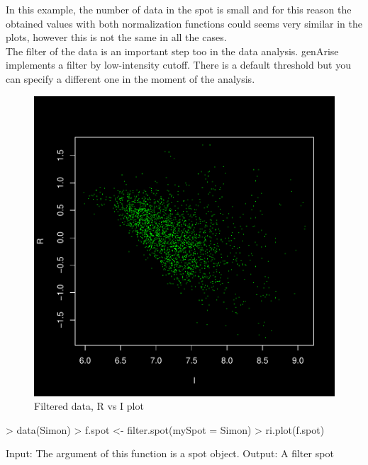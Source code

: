 \documentclass[12pt]{article}
\begin{document}
In this example, the number of data in the spot is small and for this reason the obtained values with both normalization functions could seems very similar in the plots, however this is not the same in all the cases.\\
\pagebreak
The filter of the data is an important step too in the data analysis. genArise implements a filter by low-intensity cutoff. There is a default threshold but you can specify a different one in the moment of the analysis.
\begin{figure}[h]
\begin{center}
\includegraphics{example-genArise-012}
\caption{Filtered data, R vs I plot \label{fig8}}	
\end{center}
\end{figure}

\begin{Scode}
> data(Simon)
> f.spot <- filter.spot(mySpot = Simon)
> ri.plot(f.spot)
\end{Scode}

\begin{Soutput}
Input: The argument of this function is a spot object.
Output: A filter spot 
\end{Soutput}
\end{document}
